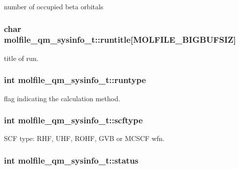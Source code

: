 number of occupied beta orbitals \hypertarget{structmolfile__qm__sysinfo__t_ab95a65da81080c566056e0c0bb3993a7}{
\subsubsection[{runtitle}]{\setlength{\rightskip}{0pt plus 5cm}char {\bf molfile\-\_\-qm\-\_\-sysinfo\-\_\-t\-::runtitle}\mbox{[}{\bf \-M\-O\-L\-F\-I\-L\-E\-\_\-\-B\-I\-G\-B\-U\-F\-S\-I\-Z}\mbox{]}}}\label{structmolfile__qm__sysinfo__t_ab95a65da81080c566056e0c0bb3993a7}
title of run. \hypertarget{structmolfile__qm__sysinfo__t_afd30b4b270a375091eda6773bbb52dbb}{
\subsubsection[{runtype}]{\setlength{\rightskip}{0pt plus 5cm}int {\bf molfile\-\_\-qm\-\_\-sysinfo\-\_\-t\-::runtype}}}\label{structmolfile__qm__sysinfo__t_afd30b4b270a375091eda6773bbb52dbb}
flag indicating the calculation method. \hypertarget{structmolfile__qm__sysinfo__t_a311514821c1c527a1158216aa77a9211}{
\subsubsection[{scftype}]{\setlength{\rightskip}{0pt plus 5cm}int {\bf molfile\-\_\-qm\-\_\-sysinfo\-\_\-t\-::scftype}}}\label{structmolfile__qm__sysinfo__t_a311514821c1c527a1158216aa77a9211}
\-S\-C\-F type\-: \-R\-H\-F, \-U\-H\-F, \-R\-O\-H\-F, \-G\-V\-B or \-M\-C\-S\-C\-F wfn. \hypertarget{structmolfile__qm__sysinfo__t_a5a58f87d6b83cc830a29305ebe7fc06d}{
\subsubsection[{status}]{\setlength{\rightskip}{0pt plus 5cm}int {\bf molfile\-\_\-qm\-\_\-sysinfo\-\_\-t\-::status}}}\label{structmolfile__qm__sysinfo__t_a5a58f87d6b83cc830a29305ebe7fc06d}
